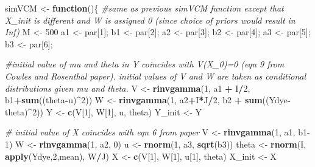 \documentclass[
]{article}
\newenvironment{Shaded}{\begin{snugshade}}{\end{snugshade}}
\newcommand{\CommentTok}[1]{\textcolor[rgb]{0.56,0.35,0.01}{\textit{#1}}}
\newcommand{\ControlFlowTok}[1]{\textcolor[rgb]{0.13,0.29,0.53}{\textbf{#1}}}
\newcommand{\DecValTok}[1]{\textcolor[rgb]{0.00,0.00,0.81}{#1}}
\newcommand{\FunctionTok}[1]{\textcolor[rgb]{0.13,0.29,0.53}{\textbf{#1}}}
\newcommand{\NormalTok}[1]{#1}
\newcommand{\OtherTok}[1]{\textcolor[rgb]{0.56,0.35,0.01}{#1}}
\newcommand{\SpecialCharTok}[1]{\textcolor[rgb]{0.81,0.36,0.00}{\textbf{#1}}}
\begin{document}
\begin{Shaded}
\begin{Highlighting}[]
\NormalTok{simVCM }\OtherTok{\textless{}{-}} \ControlFlowTok{function}\NormalTok{()\{ }\CommentTok{\#same as previous simVCM function except that X\_init is different and W is assigned 0 (since choice of priors would result in Inf)}
\NormalTok{  M }\OtherTok{\textless{}{-}} \DecValTok{500}
\NormalTok{  a1 }\OtherTok{\textless{}{-}}\NormalTok{ par[}\DecValTok{1}\NormalTok{]; b1 }\OtherTok{\textless{}{-}}\NormalTok{ par[}\DecValTok{2}\NormalTok{]; a2 }\OtherTok{\textless{}{-}}\NormalTok{ par[}\DecValTok{3}\NormalTok{]; b2 }\OtherTok{\textless{}{-}}\NormalTok{ par[}\DecValTok{4}\NormalTok{]; a3 }\OtherTok{\textless{}{-}}\NormalTok{ par[}\DecValTok{5}\NormalTok{]; b3 }\OtherTok{\textless{}{-}}\NormalTok{ par[}\DecValTok{6}\NormalTok{];}
  
  \CommentTok{\#initial value of mu and theta in Y coincides with V(X\_0)=0 (eqn 9 from Cowles and Rosenthal paper). initial values of V and W are taken as conditional distributions given mu and theta.}
\NormalTok{  V }\OtherTok{\textless{}{-}} \FunctionTok{rinvgamma}\NormalTok{(}\DecValTok{1}\NormalTok{, a1 }\SpecialCharTok{+}\NormalTok{ I}\SpecialCharTok{/}\DecValTok{2}\NormalTok{, b1}\SpecialCharTok{+}\FunctionTok{sum}\NormalTok{((theta}\SpecialCharTok{{-}}\NormalTok{u)}\SpecialCharTok{\^{}}\DecValTok{2}\NormalTok{))}
\NormalTok{  W }\OtherTok{\textless{}{-}} \FunctionTok{rinvgamma}\NormalTok{(}\DecValTok{1}\NormalTok{, a2}\SpecialCharTok{+}\NormalTok{I}\SpecialCharTok{*}\NormalTok{J}\SpecialCharTok{/}\DecValTok{2}\NormalTok{, b2 }\SpecialCharTok{+} \FunctionTok{sum}\NormalTok{((Ydye}\SpecialCharTok{{-}}\NormalTok{theta)}\SpecialCharTok{\^{}}\DecValTok{2}\NormalTok{))}
\NormalTok{  Y }\OtherTok{\textless{}{-}} \FunctionTok{c}\NormalTok{(V[}\DecValTok{1}\NormalTok{], W[}\DecValTok{1}\NormalTok{], u, theta)}
\NormalTok{  Y\_init }\OtherTok{\textless{}{-}}\NormalTok{ Y}
  
  \CommentTok{\# initial value of X coincides with eqn 6 from paper}
\NormalTok{  V }\OtherTok{\textless{}{-}} \FunctionTok{rinvgamma}\NormalTok{(}\DecValTok{1}\NormalTok{, a1, b1}\DecValTok{{-}1}\NormalTok{)}
\NormalTok{  W }\OtherTok{\textless{}{-}} \FunctionTok{rinvgamma}\NormalTok{(}\DecValTok{1}\NormalTok{, a2, }\DecValTok{0}\NormalTok{)}
\NormalTok{  u }\OtherTok{\textless{}{-}} \FunctionTok{rnorm}\NormalTok{(}\DecValTok{1}\NormalTok{, a3, }\FunctionTok{sqrt}\NormalTok{(b3))}
\NormalTok{  theta }\OtherTok{\textless{}{-}} \FunctionTok{rnorm}\NormalTok{(I, }\FunctionTok{apply}\NormalTok{(Ydye,}\DecValTok{2}\NormalTok{,mean), W}\SpecialCharTok{/}\NormalTok{J)}
\NormalTok{  X }\OtherTok{\textless{}{-}} \FunctionTok{c}\NormalTok{(V[}\DecValTok{1}\NormalTok{], W[}\DecValTok{1}\NormalTok{], u[}\DecValTok{1}\NormalTok{], theta)}
\NormalTok{  X\_init }\OtherTok{\textless{}{-}}\NormalTok{ X}


\end{Highlighting}
\end{Shaded}
\end{document}
